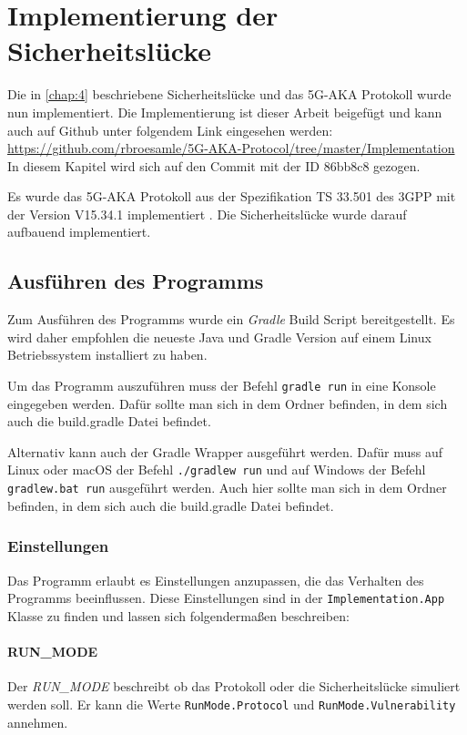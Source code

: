 \chapter{Implementierung der Sicherheitsl\"ucke}
\label{chap:5}

Die in \cref{chap:4} beschriebene Sicherheitslücke und das 5G-AKA Protokoll wurde nun implementiert.
Die Implementierung ist dieser Arbeit beigefügt und kann auch auf Github unter folgendem Link eingesehen werden: \url{https://github.com/rbroesamle/5G-AKA-Protocol/tree/master/Implementation}
In diesem Kapitel wird sich auf den Commit mit der ID 86bb8c8 gezogen.

Es wurde das 5G-AKA Protokoll aus der Spezifikation TS 33.501 des 3GPP mit der Version V15.34.1 implementiert \cite{3gppTS33.501V15.34.1}.
Die Sicherheitslücke wurde darauf aufbauend implementiert.


\section{Ausführen des Programms}
Zum Ausführen des Programms wurde ein \textit{Gradle} Build Script bereitgestellt.
Es wird daher empfohlen die neueste Java und Gradle Version auf einem Linux Betriebssystem installiert zu haben.

Um das Programm auszuführen muss der Befehl \lstinline{gradle run} in eine Konsole eingegeben werden.
Dafür sollte man sich in dem Ordner befinden, in dem sich auch die build.gradle Datei befindet.

Alternativ kann auch der Gradle Wrapper ausgeführt werden.
Dafür muss auf Linux oder macOS der Befehl \lstinline{./gradlew run} und auf Windows der Befehl \lstinline{gradlew.bat run} ausgeführt werden.
Auch hier sollte man sich in dem Ordner befinden, in dem sich auch die build.gradle Datei befindet.

\subsection{Einstellungen}

Das Programm erlaubt es Einstellungen anzupassen, die das Verhalten des Programms beeinflussen.
Diese Einstellungen sind in der \lstinline{Implementation.App} Klasse zu finden und lassen sich folgendermaßen beschreiben:

\subsubsection{RUN\_MODE}
Der \textit{RUN\_MODE} beschreibt ob das Protokoll oder die Sicherheitslücke simuliert werden soll.
Er kann die Werte \lstinline{RunMode.Protocol} und \lstinline{RunMode.Vulnerability} annehmen.

